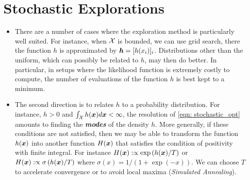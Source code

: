 \documentclass[11pt]{article}
\begin{document}
\section{Stochastic Explorations}
\begin{itemize}
\item There are a number of cases where the exploration method is particularly well suited. For instance, when ${\mathcal X}$ is bounded, we can use grid search, there the function $h$ is approximated by  $\boldsymbol{h}= [h(x_i)]_{i}$. Distributions other than the uniform, which can possibly be related to $h$, may then do better. In particular, in setups where the likelihood function is extremely costly to compute, the number of evaluations of the function $h$ is best kept to a minimum.

\item The second direction is to relates $h$ to a probability distribution. For instance, $h >0$ and $\int_{{\mathcal X}} h(\boldsymbol{x}) d\boldsymbol{x} < \infty$, the resolution of \eqref{eqn: stochastic_opt} amounts to finding the \emph{\textbf{modes}} of the density $h$. More generally, if these conditions are not satisfied, then we may be able to transform the function $h(\boldsymbol{x})$ into another function $H(\boldsymbol{x})$ that satisfies the condition of positivity with finite integral. For instance $H(\boldsymbol{x}) :\propto \exp\left(h(\boldsymbol{x})/T\right)$ or $H(\boldsymbol{x}) :\propto \sigma\left(h(\boldsymbol{x})/T\right)$ where $\sigma(x) = 1/(1 + \exp(-x))$. We can choose $T$ to accelerate convergence or to avoid local maxima (\emph{Simulated Annealing}). 
\end{itemize}
\end{document}
